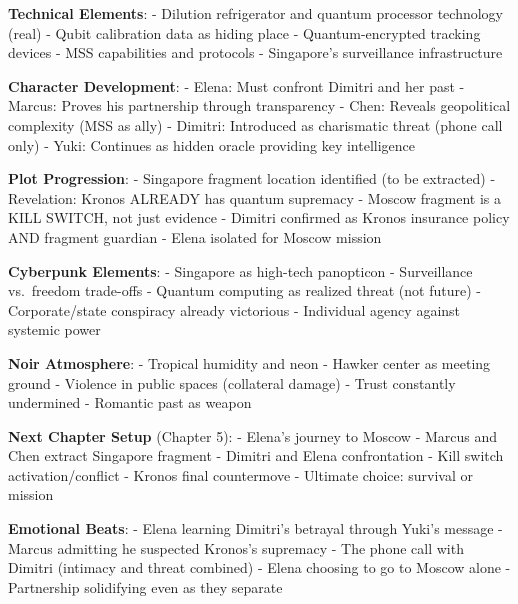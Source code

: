 \textbf{Technical Elements}: - Dilution refrigerator and quantum processor technology (real) - Qubit calibration data as hiding place - Quantum-encrypted tracking devices - MSS capabilities and protocols - Singapore's surveillance infrastructure

\textbf{Character Development}: - Elena: Must confront Dimitri and her past - Marcus: Proves his partnership through transparency - Chen: Reveals geopolitical complexity (MSS as ally) - Dimitri: Introduced as charismatic threat (phone call only) - Yuki: Continues as hidden oracle providing key intelligence

\textbf{Plot Progression}: - Singapore fragment location identified (to be extracted) - Revelation: Kronos ALREADY has quantum supremacy - Moscow fragment is a KILL SWITCH, not just evidence - Dimitri confirmed as Kronos insurance policy AND fragment guardian - Elena isolated for Moscow mission

\textbf{Cyberpunk Elements}: - Singapore as high-tech panopticon - Surveillance vs.~freedom trade-offs - Quantum computing as realized threat (not future) - Corporate/state conspiracy already victorious - Individual agency against systemic power

\textbf{Noir Atmosphere}: - Tropical humidity and neon - Hawker center as meeting ground - Violence in public spaces (collateral damage) - Trust constantly undermined - Romantic past as weapon

\textbf{Next Chapter Setup} (Chapter 5): - Elena's journey to Moscow - Marcus and Chen extract Singapore fragment - Dimitri and Elena confrontation - Kill switch activation/conflict - Kronos final countermove - Ultimate choice: survival or mission

\textbf{Emotional Beats}: - Elena learning Dimitri's betrayal through Yuki's message - Marcus admitting he suspected Kronos's supremacy - The phone call with Dimitri (intimacy and threat combined) - Elena choosing to go to Moscow alone - Partnership solidifying even as they separate
